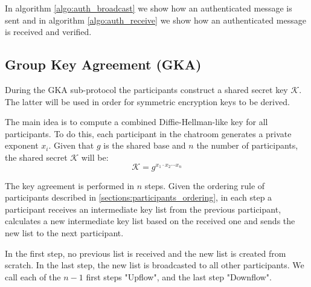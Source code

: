 In algorithm \ref{algo:auth_broadcast} we show how an authenticated message is sent and in algorithm \ref{algo:auth_receive} we show how an authenticated message is received and verified.

\begin{algorithm}[t]
  
\end{algorithm}

\begin{algorithm}[t]
  
\end{algorithm}

\subsection{Group Key Agreement (GKA)}
\label{subsections:gka}

During the GKA sub-protocol the participants construct a shared secret key $\mathcal{K}$. The latter will be used in order for symmetric encryption keys to be derived.

The main idea is to compute a combined Diffie-Hellman-like key for all participants. To do this, each participant in the chatroom generates a private exponent $x_i$. Given that $g$ is the shared base and $n$ the number of participants, the shared secret $\mathcal{K}$ will be:
\[
\mathcal{K} = g^{x_1 \cdot x_2 \cdots x_n}
\]

The key agreement is performed in $n$ steps. Given the ordering rule of participants described in \ref{sections:participants_ordering}, in each step a participant receives an intermediate key list from the previous participant, calculates a new intermediate key list based on the received one and sends the new list to the next participant.

In the first step, no previous list is received and the new list is created from scratch. In the last step, the new list is broadcasted to all other participants. We call each of the $n-1$ first steps "Upflow", and the last step "Downflow".

